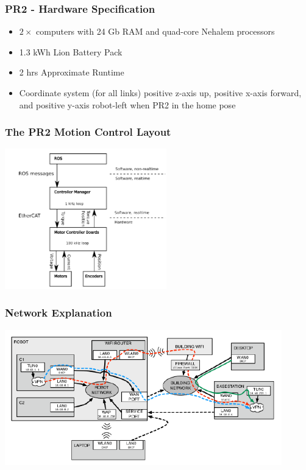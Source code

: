 \begin{frame}
  \frametitle{PR2 - Hardware Specification}
\begin{itemize}
    \item $2\times$ computers with 24 Gb RAM and quad-core Nehalem processors
    \item 1.3 kWh Lion Battery Pack
    \item 2 hrs Approximate Runtime
    \item Coordinate system (for all links) positive z-axis up, positive x-axis forward, and positive y-axis robot-left when PR2 in the home pose
    
\end{itemize}
\end{frame}


\begin{frame}
  \frametitle{The PR2 Motion Control Layout}
\hspace{15ex}\includegraphics[width=7cm]{img/motion_control.png} 
\end{frame}

\begin{frame}
  \frametitle{Network Explanation}
\includegraphics[width=12cm]{img/network.png} 
\end{frame}


